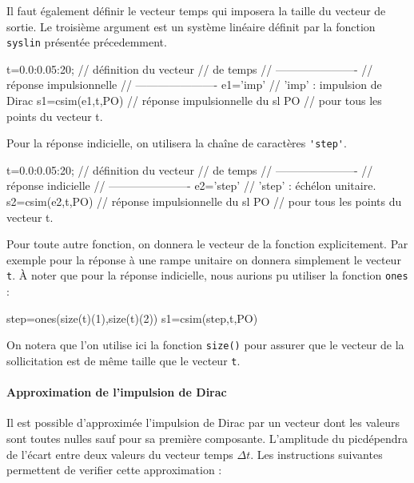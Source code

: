 Il faut également définir le vecteur temps qui imposera la 
taille du vecteur de sortie. Le troisième argument est un système linéaire
définit par la fonction \verb?syslin? présentée précedemment. 
\begin{Scilabcode}
t=0.0:0.05:20;              // définition du vecteur 
                            // de temps
// ----------------------
// réponse impulsionnelle
// ----------------------
e1='imp'                    // 'imp' : impulsion de Dirac
s1=csim(e1,t,PO)            // réponse impulsionnelle du sl PO
                            // pour tous les points du vecteur t.

\end{Scilabcode}
Pour la réponse indicielle, on utilisera la chaîne de caractères \verb?'step'?.
\begin{Scilabcode}
t=0.0:0.05:20;              // définition du vecteur 
                            // de temps
// ----------------------
// réponse indicielle 
// ----------------------
e2='step'                   // 'step' : échélon unitaire.
s2=csim(e2,t,PO)            // réponse impulsionnelle du sl PO
                            // pour tous les points du vecteur t.

\end{Scilabcode}
Pour toute autre fonction, on donnera le vecteur de la fonction explicitement. 
Par exemple pour la réponse à une rampe unitaire on donnera simplement 
le vecteur \verb?t?. \`A noter que pour la réponse indicielle, nous aurions 
pu utiliser la fonction \verb?ones? :

\begin{Scilabcode}
step=ones(size(t)(1),size(t)(2))
s1=csim(step,t,PO)
\end{Scilabcode}

On notera que l'on utilise ici la fonction \verb?size()? pour assurer que le 
vecteur de la sollicitation est de même taille que le vecteur \verb?t?. 

\paragraph{Approximation de l'impulsion de Dirac}

Il est possible d'approximée l'impulsion de Dirac par un vecteur dont
les valeurs sont toutes nulles sauf pour sa première composante. 
L'amplitude du \og pic\fg dépendra de l'écart entre deux valeurs du vecteur 
temps $\Delta t$.
Les instructions suivantes permettent de verifier cette approximation :

